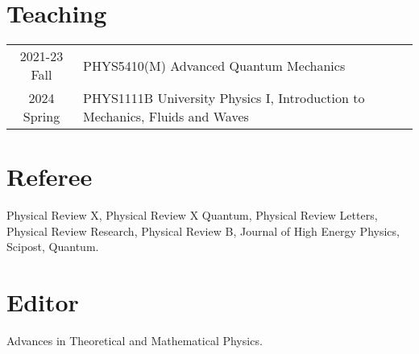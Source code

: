 \documentclass[hidelinks,a4paper]{article}
\begin{document}
\section*{Teaching}
\begin{tabular}{cl}
  2021-23 Fall & PHYS5410(M) Advanced Quantum Mechanics\\
  2024 Spring& PHYS1111B University Physics I, Introduction to Mechanics, Fluids and Waves
\end{tabular}



\section*{Referee}
Physical Review X, Physical Review X Quantum, Physical Review Letters, Physical
Review Research, Physical Review B, Journal of High Energy Physics, Scipost, Quantum.
\section*{Editor}
Advances in Theoretical and Mathematical Physics.
\end{document}
